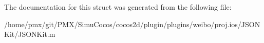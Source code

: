 The documentation for this struct was generated from the following file\+:\begin{DoxyCompactItemize}
\item 
/home/pmx/git/\+P\+M\+X/\+Simu\+Cocos/cocos2d/plugin/plugins/weibo/proj.\+ios/\+J\+S\+O\+N\+Kit/J\+S\+O\+N\+Kit.\+m\end{DoxyCompactItemize}
